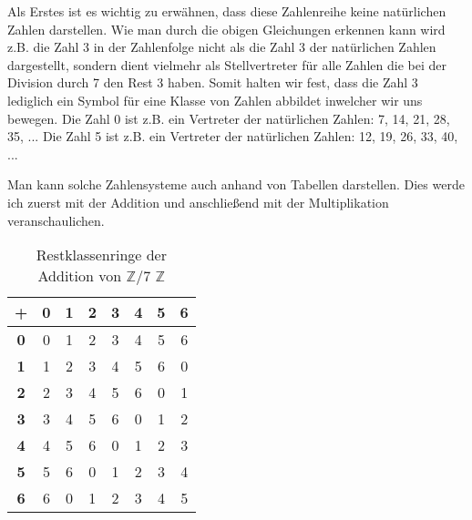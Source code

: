 \documentclass[12pt,a4paper]{article}
\theoremstyle{definition}
\begin{document}
Als Erstes ist es wichtig zu erwähnen, dass diese Zahlenreihe keine natürlichen Zahlen darstellen.
Wie man durch die obigen Gleichungen erkennen kann wird z.B. die Zahl 3 in der Zahlenfolge nicht als die Zahl 3 der natürlichen Zahlen dargestellt, sondern dient vielmehr als Stellvertreter für alle Zahlen die bei der Division durch 7 den Rest 3 haben.
Somit halten wir fest, dass die Zahl 3 lediglich ein Symbol für eine Klasse von Zahlen abbildet inwelcher wir uns bewegen.\newline
Die Zahl 0 ist z.B. ein Vertreter der natürlichen Zahlen: 7, 14, 21, 28, 35, ...\newline
Die Zahl 5 ist z.B. ein Vertreter der natürlichen Zahlen: 12, 19, 26, 33, 40, ...

Man kann solche Zahlensysteme auch anhand von Tabellen darstellen.
Dies werde ich zuerst mit der Addition und anschließend mit der Multiplikation veranschaulichen.
\begin{table}[h]\begin{center}
\begin{tabular}{c||c|c|c|c|c|c|c}
\textbf{+} & \textbf{0} & \textbf{1} & \textbf{2} & \textbf{3} & \textbf{4} & \textbf{5} & \textbf{6} \\
\hline\hline
\textbf{0} & 0 & 1 & 2 & 3 & 4 & 5 & 6 \\
\hline
\textbf{1} & 1 & 2 & 3 & 4 & 5 & 6 & 0 \\
\hline
\textbf{2} & 2 & 3 & 4 & 5 & 6 & 0 & 1 \\
\hline
\textbf{3} & 3 & 4 & 5 & 6 & 0 & 1 & 2 \\
\hline
\textbf{4} & 4 & 5 & 6 & 0 & 1 & 2 & 3 \\
\hline
\textbf{5} & 5 & 6 & 0 & 1 & 2 & 3 & 4 \\
\hline
\textbf{6} & 6 & 0 & 1 & 2 & 3 & 4 & 5
\end{tabular}\end{center}
\caption{Restklassenringe der Addition von $\mathbb{Z}$/7 $\mathbb{Z}$}
\label{tab:Restklassenringe der Addition}
\end{table}
\end{document}
